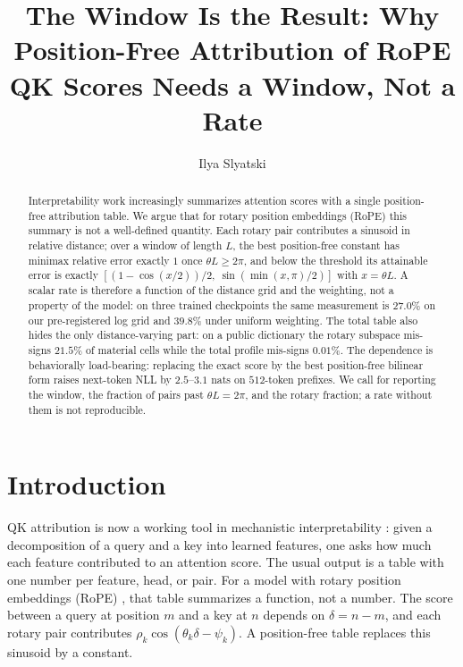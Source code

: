 \documentclass{article}
\title{\vspace{-2.5ex}%
  \textbf{The Window Is the Result: Why Position-Free Attribution of
  RoPE QK Scores Needs a Window, Not a Rate}%
  \vspace{-1.5ex}}
\author{Ilya Slyatski}
\theoremstyle{plain}
\theoremstyle{remark}
\begin{document}
\maketitle

\begin{abstract}
Interpretability work increasingly summarizes attention scores with a single
position-free attribution table. We argue that for rotary position embeddings
(RoPE) this summary is not a well-defined quantity. Each rotary pair contributes
a sinusoid in relative distance; over a window of length $L$, the best
position-free constant has minimax relative error exactly $1$ once
$\theta L\ge2\pi$, and below the threshold its attainable error is exactly
$[(1-\cos(x/2))/2,\ \sin(\min(x,\pi)/2)]$ with $x=\theta L$. A scalar rate is
therefore a function of the distance grid and the weighting, not a property of
the model: on three trained checkpoints the same measurement is $27.0\%$ on our
pre-registered log grid and $39.8\%$ under uniform weighting. The total table
also hides the only distance-varying part: on a public dictionary the rotary
subspace mis-signs $21.5\%$ of material cells while the total profile mis-signs
$0.01\%$. The dependence is behaviorally load-bearing: replacing the exact score
by the best position-free bilinear form raises next-token NLL by $2.5$--$3.1$
nats on $512$-token prefixes. We call for reporting the window, the fraction of
pairs past $\theta L=2\pi$, and the rotary fraction; a rate without them is not
reproducible.
\end{abstract}

\section{Introduction}

QK attribution is now a working tool in mechanistic interpretability
\citep{kamath2025tracing}: given a decomposition of a query and a key into
learned features, one asks how much each feature contributed to an attention
score. The usual output is a table with one number per feature, head, or pair.
For a model with rotary position embeddings (RoPE) \citep{su2021ropeformer},
that table summarizes a function, not a number. The score between a query at
position $m$ and a key at $n$ depends on $\delta=n-m$, and each rotary pair
contributes $\rho_k\cos(\theta_k\delta-\psi_k)$. A position-free table replaces
this sinusoid by a constant.
\end{document}

